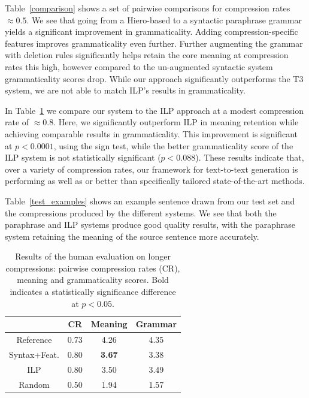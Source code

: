 \documentclass[11pt]{article}
\begin{document}
Table~\ref{comparison} shows a set of pairwise comparisons for
compression rates $\approx 0.5$. We see that going from a Hiero-based
to a syntactic paraphrase grammar yields a significant improvement in
grammaticality. Adding compression-specific features improves
grammaticality even further. Further augmenting the grammar with
deletion rules significantly helps retain the core meaning at
compression rates this high, however compared to the un-augmented
syntactic system grammaticality scores drop. While our approach
significantly outperforms the T3 system, we are not able to match
ILP's results in grammaticality.


In Table~\ref{human_judgments} we compare our system to the ILP
approach at a modest compression rate of $\approx 0.8$.  Here, we
significantly outperform ILP in meaning retention while achieving
comparable results in grammaticality.
This improvement is
  significant at $p < 0.0001$, using the sign test, while the better
  grammaticality score of the ILP system is not statistically
  significant ($p < 0.088$).
These results indicate that, over a variety of compression rates, our framework for text-to-text
generation is performing as well as or better than specifically
tailored state-of-the-art methods.

Table~\ref{test_examples} shows an example sentence drawn from our
test set and the compressions produced by the different systems. We
see that both the paraphrase and ILP systems produce good quality
results, with the paraphrase system retaining the meaning of the
source sentence more accurately.


 \begin{table}
   \small
   \begin{center}
     \begin{tabular}{|c|c|c|c|}
       \hline
       & CR & Meaning & Grammar \\
       \hline
       Reference & 0.73 &  4.26 & 4.35 \\
       \hline
       \hline
       Syntax+Feat. & 0.80 & {\bf 3.67} & 3.38 \\
       ILP & 0.80 & 3.50 & 3.49 \\
       \hline
       \hline
       Random & 0.50 & 1.94 & 1.57 \\
       \hline
     \end{tabular}
   \end{center}
   \normalsize
   \caption{Results of the human evaluation on longer compressions:
     pairwise compression rates (CR), meaning and grammaticality scores. 
     Bold indicates a statistically significance difference at $p < 0.05$. \vspace{-.25cm}}
   \label{human_judgments}
 \end{table}
\end{document}
